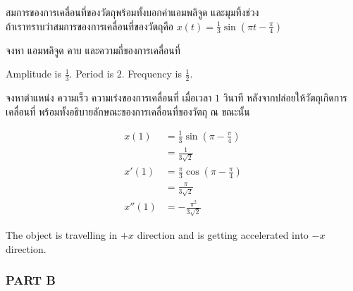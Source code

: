 \documentclass[12pt,final]{novelette} %
\begin{document}
\begin{question}
    \item {}
    สมการของการเคลื่อนที่ของวัตถุพร้อมทั้งบอกค่าแอมพลิจูด และมุมทิ้งช่วง \\
    ถ้าเราทราบว่าสมการของการเคลื่อนที่ของวัตถุคือ $x(t) = \frac13 \sin(\pi t - \frac\pi4)$
    \begin{question}
        \item
        จงหา แอมพลิจูด คาบ และความถี่ของการเคลื่อนที่ 

        \bigskip
        Amplitude is $\boxed{\frac13}$. Period is $\boxed{2}$. Frequency is $\boxed{\frac12}$.

        \item
        จงหาตําแหน่ง ความเร็ว ความเร่งของการเคลื่อนที่ เมื่อเวลา $1$ วินาที หลังจากปล่อยให้วัตถุเกิดการเคลื่อนที่
        พร้อมทั้งอธิบายลักษณะของการเคลื่อนที่ของวัตถุ ณ ขณะนั้น 

        \phantom{}
        \vspace*{-1em}
        \begin{align*}
            x(1)   & = \frac13 \sin\left(\pi - \frac\pi4\right)   \\
                   & = \boxed{\frac1{3\sqrt2}}                    \\
            x'(1)  & = \frac\pi3 \cos\left(\pi - \frac\pi4\right) \\
                   & = \boxed{\frac{\pi}{3\sqrt2}}                \\
            x''(1) & = \boxed{-\frac{\pi^2}{3\sqrt2}}
        \end{align*}

        The object is travelling in $+x$ direction and is getting accelerated into $-x$ direction.
    \end{question}
\end{question}

\subsubsection*{PART B}
\end{document}
